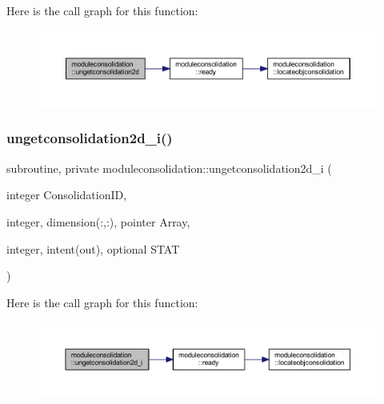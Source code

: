 Here is the call graph for this function\+:\nopagebreak
\begin{figure}[H]
\begin{center}
\leavevmode
\includegraphics[width=350pt]{namespacemoduleconsolidation_a9e7318abc8bb17ca00bd720c8eff021f_cgraph}
\end{center}
\end{figure}
\mbox{\label{namespacemoduleconsolidation_aeceaae1f01485ce743c8347e2a73399e}} 
\subsubsection{\texorpdfstring{ungetconsolidation2d\+\_\+i()}{ungetconsolidation2d\_i()}}
{\footnotesize\ttfamily subroutine, private moduleconsolidation\+::ungetconsolidation2d\+\_\+i (\begin{DoxyParamCaption}\item[{integer}]{Consolidation\+ID,  }\item[{integer, dimension(\+:,\+:), pointer}]{Array,  }\item[{integer, intent(out), optional}]{S\+T\+AT }\end{DoxyParamCaption})\hspace{0.3cm}{\ttfamily [private]}}

Here is the call graph for this function\+:\nopagebreak
\begin{figure}[H]
\begin{center}
\leavevmode
\includegraphics[width=350pt]{namespacemoduleconsolidation_aeceaae1f01485ce743c8347e2a73399e_cgraph}
\end{center}
\end{figure}
\mbox{\label{namespacemoduleconsolidation_a72d92545dc323c3374c46a863489ab61}} 
